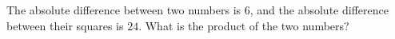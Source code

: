 The absolute difference between two numbers is $6$, and the absolute difference between their squares is $24$. What is the product of the two numbers?
